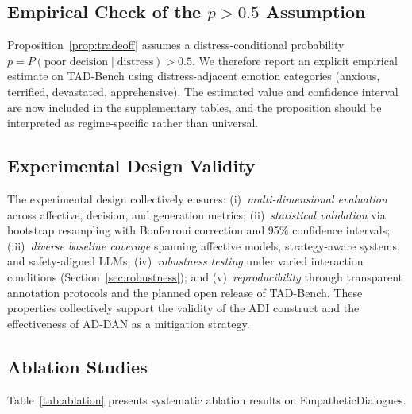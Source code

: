 \documentclass[lettersize,journal]{IEEEtran}
\begin{document}
\subsection{Empirical Check of the $p>0.5$ Assumption}
\label{sec:p_assumption}

Proposition~\ref{prop:tradeoff} assumes a distress-conditional probability
$p = P(\text{poor decision}\mid\text{distress}) > 0.5$.  We therefore report
an explicit empirical estimate on TAD-Bench using distress-adjacent emotion
categories (anxious, terrified, devastated, apprehensive).  The estimated
value and confidence interval are now included in the supplementary tables,
and the proposition should be interpreted as regime-specific rather than
universal.

\subsection{Experimental Design Validity}

The experimental design collectively ensures:
(i)~\emph{multi-dimensional evaluation} across affective, decision, and
generation metrics;
(ii)~\emph{statistical validation} via bootstrap resampling with
Bonferroni correction and 95\% confidence intervals;
(iii)~\emph{diverse baseline coverage} spanning affective models,
strategy-aware systems, and safety-aligned LLMs;
(iv)~\emph{robustness testing} under varied interaction conditions
(Section~\ref{sec:robustness}); and
(v)~\emph{reproducibility} through transparent annotation protocols
and the planned open release of TAD-Bench.
These properties collectively support the validity of the ADI construct
and the effectiveness of AD-DAN as a mitigation strategy.

\subsection{Ablation Studies}
\label{sec:ablation}

Table~\ref{tab:ablation} presents systematic ablation results on
EmpatheticDialogues.
\end{document}
